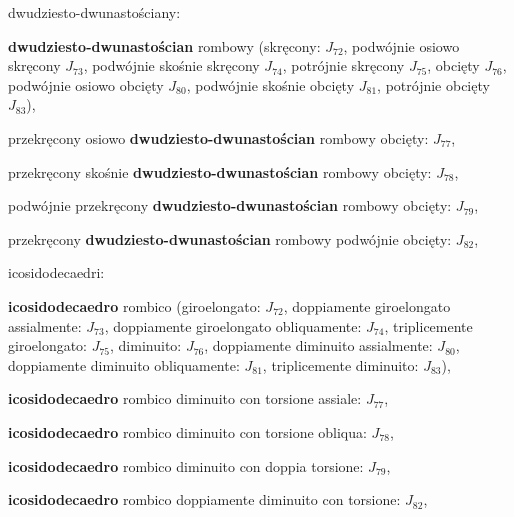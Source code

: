 \begin{compactitem}
\begin{compactitem}
\begin{compactitem}
\begin{compactitem}
\begin{compactitem}
\begin{compactitem}
\begin{compactitem}
\begin{compactitem}
\begin{compactitem}
\begin{compactitem}
    \item dwudziesto-dwunastościany: \begin{compactitem} %
        \item \textbf{dwudziesto-dwunastościan} rombowy (skręcony: $J_{72}$, podwójnie osiowo skręcony $J_{73}$, podwójnie skośnie skręcony $J_{74}$, potrójnie skręcony $J_{75}$, obcięty $J_{76}$, podwójnie osiowo obcięty $J_{80}$, podwójnie skośnie obcięty $J_{81}$, potrójnie obcięty $J_{83}$), %
        \item przekręcony osiowo \textbf{dwudziesto-dwunastościan} rombowy obcięty: $J_{77}$, %
        \item przekręcony skośnie \textbf{dwudziesto-dwunastościan} rombowy obcięty: $J_{78}$, %
        \item podwójnie przekręcony \textbf{dwudziesto-dwunastościan} rombowy obcięty: $J_{79}$, %
        \item przekręcony \textbf{dwudziesto-dwunastościan} rombowy podwójnie obcięty: $J_{82}$, %
    \item icosidodecaedri: \begin{compactitem} %
        \item \textbf{icosidodecaedro} rombico (giroelongato: $J_{72}$, doppiamente giroelongato assialmente: $J_{73}$, doppiamente giroelongato obliquamente: $J_{74}$, triplicemente giroelongato: $J_{75}$, diminuito: $J_{76}$, doppiamente diminuito assialmente: $J_{80}$, doppiamente diminuito obliquamente: $J_{81}$, triplicemente diminuito: $J_{83}$), %
        \item \textbf{icosidodecaedro} rombico diminuito con torsione assiale: $J_{77}$, %
        \item \textbf{icosidodecaedro} rombico diminuito con torsione obliqua: $J_{78}$, %
        \item \textbf{icosidodecaedro} rombico diminuito con doppia torsione: $J_{79}$, %
        \item \textbf{icosidodecaedro} rombico doppiamente diminuito con torsione: $J_{82}$, %
    \end{compactitem}


\end{compactitem}
\end{compactitem}
\end{compactitem}
\end{compactitem}
\end{compactitem}
\end{compactitem}
\end{compactitem}
\end{compactitem}
\end{compactitem}
\end{compactitem}
\end{compactitem}
